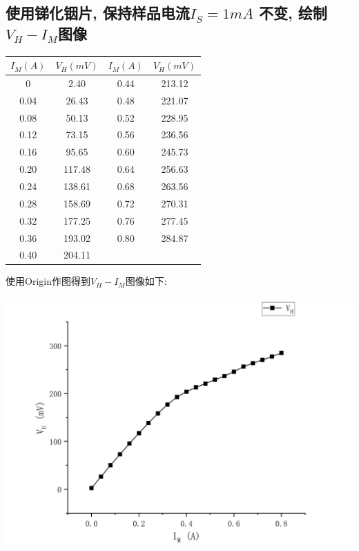 \documentclass[a4paper]{article}
\begin{document}
    \subsection{使用锑化铟片, 保持样品电流$I_S= 1mA$ 不变, 绘制$V_H - I_M$图像}\label{subsec:-$i_s=-1ma$--$v_h---i_m$}

    \begin{tabular}{|c|c|c|c|}
        \hline
        $I_M(A)$ & $V_H(mV)$ & $I_M(A)$ & $V_H(mV)$ \\
        \hline
        0        & 2.40      & 0.44     & 213.12    \\
        \hline
        0.04     & 26.43     & 0.48     & 221.07    \\
        \hline
        0.08     & 50.13     & 0.52     & 228.95    \\
        \hline
        0.12     & 73.15     & 0.56     & 236.56    \\
        \hline
        0.16     & 95.65     & 0.60     & 245.73    \\
        \hline
        0.20     & 117.48    & 0.64     & 256.63    \\
        \hline
        0.24     & 138.61    & 0.68     & 263.56    \\
        \hline
        0.28     & 158.69    & 0.72     & 270.31    \\
        \hline
        0.32     & 177.25    & 0.76     & 277.45    \\
        \hline
        0.36     & 193.02    & 0.80     & 284.87    \\
        \hline
        0.40 & 204.11 & \multicolumn{2}{c|}{ } \\
        \hline
    \end{tabular}

    \vspace{1cm}

    {使用Origin作图得到$V_H-I_M$图像如下:}

    \includegraphics[height=0.4\textheight]{5}
\end{document}
